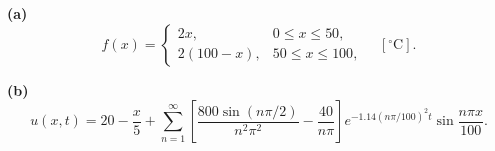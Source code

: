\noindent\textbf{(a)} \[f(x)=\begin{cases}2x,&0\le x\le50,\\2(100-x),&50\le x\le100,\end{cases}\quad[{}^\circ\mathrm C].\]

\noindent\textbf{(b)} \[u(x,t)=20-\frac x5+\sum_{n=1}^{\infty}\left[\frac{800\sin(n\pi/2)}{n^2\pi^2}-\frac{40}{n\pi}\right]e^{-1.14(n\pi/100)^2t}\sin\frac{n\pi x}{100}.\]
